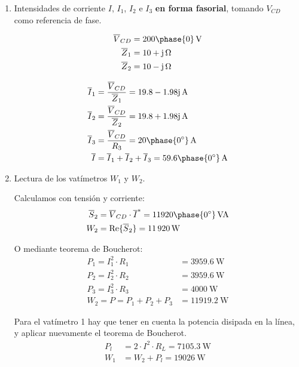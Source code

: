 \documentclass[12pt]{article}
\begin{document}
\begin{enumerate}
\item Intensidades de corriente $I$, $I_1$, $I_2$ e $I_3$ \textbf{en forma fasorial}, tomando $V_{CD}$ como referencia de fase.

  \begin{align*}
\overline{V}_{CD} &= \SI[parse-numbers=false]{200\phase{0}}{\volt}\\
%
\overline{Z}_1 &= \SI[parse-numbers=false]{10 + \mathrm{j}}{\ohm}\\
%
\overline{Z}_2 &= \SI[parse-numbers=false]{10 - \mathrm{j}}{\ohm}
\end{align*}

\begin{align*}
\overline{I}_1 &= \frac{\overline{V}_{CD}}{\overline{Z}_1} = \SI[parse-numbers=false]{19.8 - 1.98\mathrm{j}}{\ampere}\\
%
\overline{I}_2 &= \frac{\overline{V}_{CD}}{\overline{Z}_2} = \SI[parse-numbers=false]{19.8 + 1.98\mathrm{j}}{\ampere}\\
%
\overline{I}_3 &= \frac{\overline{V}_{CD}}{R_3} = \SI[parse-numbers=false]{20\phase{\ang{0}}}{\ampere}\\
%
\overline{I} &= \overline{I}_1 + \overline{I}_2 + \overline{I}_3 =  \SI[parse-numbers=false]{59.6\phase{\ang{0}}}{\ampere}\\
\end{align*}

\item Lectura de los vatímetros $W_1$ y $W_2$.

  Calculamos con tensión y corriente:
  \begin{align*}
\overline{S}_2 &= \overline{V}_{CD} \cdot \overline{I}^* = \SI[parse-numbers=false]{11920\phase{\ang{0}}}{VA}\\
%
W_2 &= \mathrm{Re}\{\overline{S}_2\} = \SI{11920}{\watt}
\end{align*}

O mediante teorema de Boucherot:
\begin{align*}
  P_1 = I_1^2 \cdot R_1 &= \SI{3959.6}{\watt}\\
  P_2 = I_2^2 \cdot R_2 &= \SI{3959.6}{\watt}\\
  P_3 = I_3^2 \cdot R_3 &= \SI{4000}{\watt}\\
  W_2 = P = P_1 + P_2 + P_3 &= \SI{11919.2}{\watt}
\end{align*}

Para el vatímetro 1 hay que tener en cuenta la potencia disipada en la línea, y aplicar nuevamente el teorema de Boucherot.
\begin{align*}
P_l &= 2 \cdot I^2 \cdot R_L = \SI{7105.3}{\watt}\\
W_1 &= W_2 + P_l = \SI{19026}{\watt}
\end{align*}

\end{enumerate}
\end{document}
